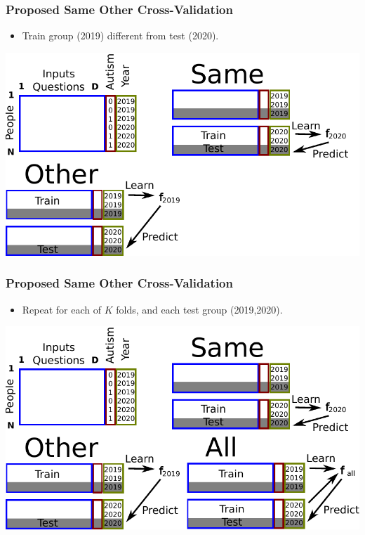 \documentclass{beamer}
\begin{document}
\begin{frame}
  \frametitle{Proposed Same Other Cross-Validation}
  \begin{itemize}
  \item Train group (2019) different from test (2020).
  \end{itemize}
  \includegraphics[width=\textwidth]{drawing-cv-same-other-years-3.pdf}
\end{frame}

\begin{frame}
  \frametitle{Proposed Same Other Cross-Validation}
  \begin{itemize}
  \item Repeat for each of $K$ folds, and each test group (2019,2020).
  \end{itemize}
  \includegraphics[width=\textwidth]{drawing-cv-same-other-years-4.pdf}
\end{frame}
\end{document}
